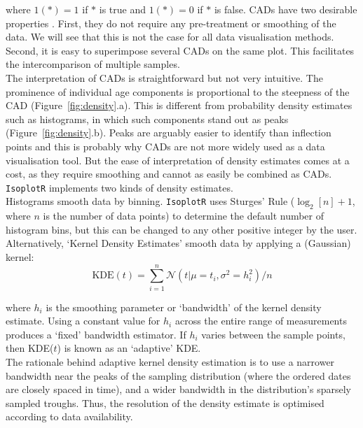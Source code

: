 \begin{refsection}
\noindent where $1(\ast) = 1$ if $\ast$ is true and $1(\ast) = 0$ if
$\ast$ is false. CADs have two desirable properties
\citep{vermeesch2007a}.  First, they do not require any pre-treatment
or smoothing of the data.  We will see that this is not the case for
all data visualisation methods. Second, it is easy to superimpose
several CADs on the same plot. This facilitates the intercomparison of
multiple samples.\\

The interpretation of CADs is straightforward but not very
intuitive. The prominence of individual age components is proportional
to the steepness of the CAD (Figure~\ref{fig:density}.a). This is
different from probability density estimates such as histograms, in
which such components stand out as peaks
(Figure~\ref{fig:density}.b). Peaks are arguably easier to identify
than inflection points and this is probably why CADs are not more
widely used as a data visualisation tool. But the ease of
interpretation of density estimates comes at a cost, as they require
smoothing and cannot as easily be combined as CADs. \texttt{IsoplotR}
implements two kinds of density estimates.\\

Histograms smooth data by binning. \texttt{IsoplotR} uses Sturges'
Rule ($\log_2[n]+1$, where $n$ is the number of data points) to
determine the default number of histogram bins, but this can be
changed to any other positive integer by the user. Alternatively,
`Kernel Density Estimates' \citep[KDEs][]{vermeesch2012b} smooth data
by applying a (Gaussian) kernel:
\begin{equation}
  \mathrm{KDE}(t) = \sum_{i=1}^{n}\mathcal{N}\left(t | \mu=t_i,
  \sigma^2=h_i^2\right)/n
  \label{eq:KDE}
\end{equation}

\noindent where $h_i$ is the smoothing parameter or `bandwidth' of the
kernel density estimate. Using a constant value for $h_i$ across the
entire range of measurements produces a `fixed' bandwidth estimator.
If $h_i$ varies between the sample points, then KDE($t$) is known as
an `adaptive' KDE.\\

The rationale behind adaptive kernel density estimation is to use a
narrower bandwidth near the peaks of the sampling distribution (where
the ordered dates are closely spaced in time), and a wider bandwidth
in the distribution's sparsely sampled troughs. Thus, the resolution
of the density estimate is optimised according to data
availability.\\


\end{refsection}
